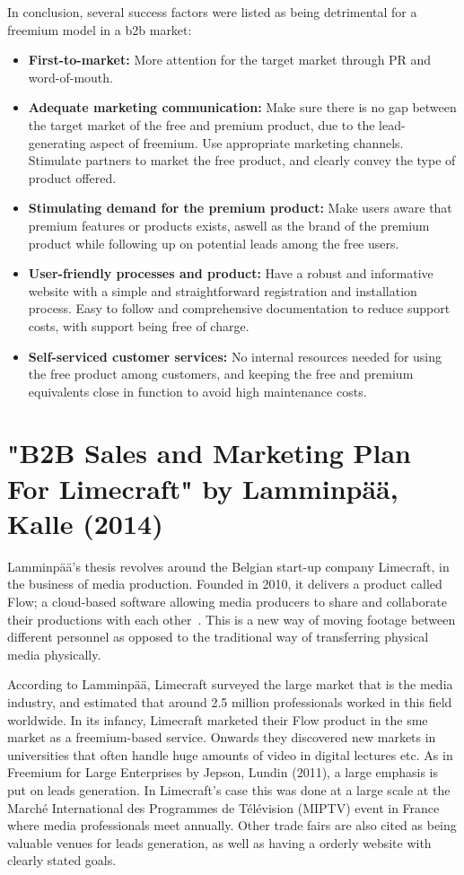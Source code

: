 In conclusion, several success factors were listed as being detrimental for a freemium model in a \gls{b2b} market:
\begin{itemize}
    \item \textbf{First-to-market: }More attention for the target market through PR and word-of-mouth. 
    \item \textbf{Adequate marketing communication: }Make sure there is no gap between the target market of the free and premium product, due to the lead-generating aspect of freemium. Use appropriate marketing channels. Stimulate partners to market the free product, and clearly convey the type of product offered.
    \item \textbf{Stimulating demand for the premium product: }Make users aware that premium features or products exists, aswell as the brand of the premium product while following up on potential leads among the free users. 
    \item \textbf{User-friendly processes and product: }Have a robust and informative website with a simple and straightforward registration and installation process. Easy to follow and comprehensive documentation to reduce support costs, with support being free of charge.
    \item \textbf{Self-serviced customer services: }No internal resources needed for using the free product among customers, and keeping the free and premium equivalents close in function to avoid high maintenance costs. 
\end{itemize}

\section{"B2B Sales and Marketing Plan For Limecraft" by Lamminpää, Kalle (2014)}
Lamminpää's thesis revolves around the Belgian start-up company Limecraft, in the business of media production. Founded in 2010, it delivers a product called Flow; a cloud-based software allowing media producers to share and collaborate their productions with each other~\cite{lamminpaa2014b2b}. This is a new way of moving footage between different personnel as opposed to the traditional way of transferring physical media physically. 


According to Lamminpää, Limecraft surveyed the large market that is the media industry, and estimated that around 2.5 million professionals worked in this field worldwide. In its infancy, Limecraft marketed their Flow product in the \gls{sme} market as a freemium-based service. Onwards they discovered new markets in universities that often handle huge amounts of video in digital lectures etc. As in Freemium for Large Enterprises by Jepson, Lundin (2011), a large emphasis is put on leads generation. In Limecraft's case this was done at a large scale at the  Marché International des Programmes de Télévision (MIPTV) event in France where media professionals meet annually. Other trade fairs are also cited as being valuable venues for leads generation, as well as having a orderly website with clearly stated goals. 


